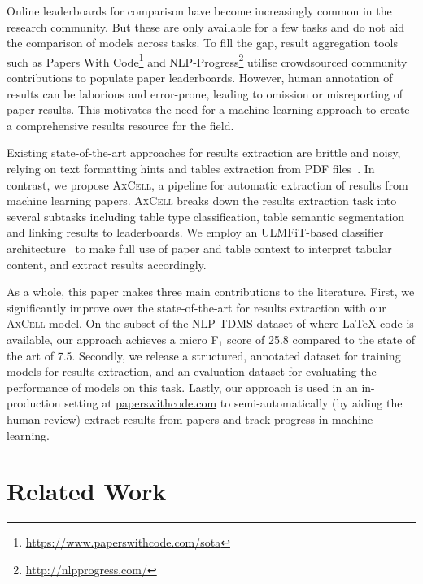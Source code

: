 \documentclass[11pt,a4paper]{article}
\newcommand{\model}{\textsc{AxCell}}
\begin{document}
Online leaderboards for comparison have become increasingly common in the research community. But these are only available for a few tasks and do not aid the comparison of models across tasks. To fill the gap, result aggregation tools such as Papers With Code\footnote{\url{https://www.paperswithcode.com/sota}} and NLP-Progress\footnote{\url{http://nlpprogress.com/}} utilise crowdsourced community contributions to populate paper leaderboards. However, human annotation of results can be laborious and error-prone, leading to omission or misreporting of paper results. This motivates the need for a machine learning approach to create a comprehensive results resource for the field.

Existing state-of-the-art approaches for results extraction are brittle and noisy, relying on text formatting hints and tables extraction from PDF files~\citep{ibm-extraction}. In contrast, we propose \model{}, a pipeline for automatic extraction of results from machine learning papers. \model{} breaks down the results extraction task into several subtasks including table type classification, table semantic segmentation and linking results to leaderboards. We employ an ULMFiT-based classifier architecture~\citep{ulmfit} to make full use of paper and table context to interpret tabular content, and extract results accordingly. 

As a whole, this paper makes three main contributions to the literature. First, we significantly improve over the state-of-the-art for results extraction with our \model{} model. On the subset of the NLP-TDMS dataset of \citet{ibm-extraction} where \LaTeX{} code is available, our approach achieves a micro F$_1$ score of 25.8 compared to the state of the art of 7.5. Secondly, we release a structured, annotated dataset for training models for results extraction, and an evaluation dataset for evaluating the performance of models on this task. Lastly, our approach is used in an in-production setting at \href{https://paperswithcode.com}{paperswithcode.com} to semi-automatically (by aiding the human review) extract results from papers and track progress in machine learning. 

\section{Related Work}
\end{document}
